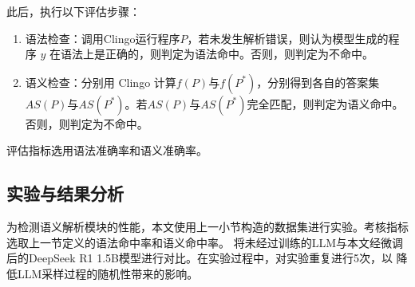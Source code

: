 此后，执行以下评估步骤：
\begin{enumerate}
\item 语法检查：调用Clingo运行程序$P$，若未发生解析错误，则认为模型生成的程序 $y$ 在语法上是正确的，则判定为语法命中。否则，则判定为不命中。
\item 语义检查：分别用 Clingo 计算$f(P)$与$f(P^*)$，分别得到各自的答案集$AS(P)$与$AS(P^*)$。若$AS(P)$与$AS(P^*)$完全匹配，则判定为语义命中。
否则，则判定为不命中。
\end{enumerate}

评估指标选用语法准确率和语义准确率。
\subsection{实验与结果分析}
为检测语义解析模块的性能，本文使用上一小节构造的数据集进行实验。考核指标选取上一节定义的语法命中率和语义命中率。
将未经过训练的LLM与本文经微调后的DeepSeek R1 1.5B模型进行对比。在实验过程中，对实验重复进行5次，以
降低LLM采样过程的随机性带来的影响。

